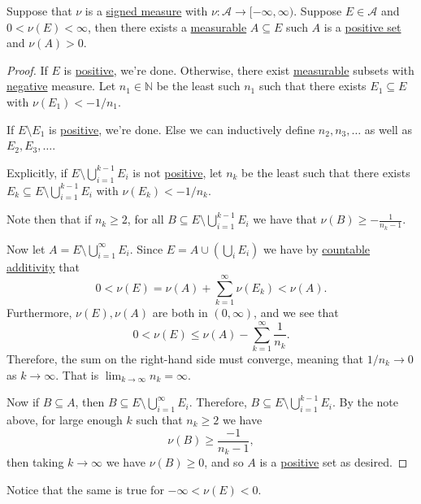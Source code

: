 \begin{lemma}\label{lma:lec28-2}
	Suppose that \(\nu\) is a \hyperref[def:signed-measure]{signed measure} with \(\nu \colon \mathcal{A} \to [-\infty, \infty)\).
	Suppose \(E \in \mathcal{A}\) and \(0 < \nu(E) < \infty\), then there exists a \hyperref[def:measurable-set]{measurable} \(A \subseteq E\)
	such \(A\) is a \hyperref[def:positive-set-for-a-signed-measure]{positive set} and \(\nu(A) > 0\).
\end{lemma}
\begin{proof}
	If \(E\) is \hyperref[def:positive-set-for-a-signed-measure]{positive}, we're done. Otherwise, there exist \hyperref[def:measurable-set]{measurable} subsets with
	\hyperref[def:negative-set-for-a-signed-measure]{negative} measure. Let \(n_1 \in \mathbb{N}\) be the least such \(n_1\) such that there exists
	\(E_1 \subseteq E\) with \(\nu(E_1) < -1/n_1\).

	If \(E \setminus E_1\) is \hyperref[def:positive-set-for-a-signed-measure]{positive}, we're done. Else we can inductively define \(n_2,n_3,\dots\) as well as \(E_2,E_3,\dots\).

	Explicitly, if \(E \setminus \bigcup_{i=1}^{k-1} E_i\) is not \hyperref[def:positive-set-for-a-signed-measure]{positive}, let \(n_k\) be the least such that there
	exists \(E_k \subseteq E \setminus \bigcup_{i=1}^{k-1} E_i\) with \(\nu(E_k) < -1/n_k\).

	Note then that if \(n_k \geq 2\), for all \(B \subseteq E \setminus \bigcup_{i=1}^{k-1}E_i\) we have that \(\nu(B) \geq -\frac{1}{n_k - 1}\).

	Now let \(A = E \setminus \bigcup_{i=1}^\infty E_i\). Since \(E = A \cup \left(\bigcup_i E_i\right)\) we have by \hyperref[def:measure-countable-additivity]{countable additivity} that
	\[
		0 < \nu(E) = \nu(A) + \sum_{k=1}^\infty \nu(E_k) < \nu(A).
	\]
	Furthermore, \(\nu(E),\nu(A)\) are both in \((0,\infty)\), and we see that
	\[
		0 < \nu(E) \leq \nu(A) - \sum_{k=1}^\infty \frac{1}{n_k}.
	\]
	Therefore, the sum on the right-hand side must converge, meaning that \(1/n_k \to 0\) as \(k \to \infty\). That is \(\lim_{k \to \infty} n_k = \infty\).

	Now if \(B \subseteq A\), then \(B \subseteq E \setminus \bigcup_{i=1}^\infty E_i\). Therefore, \(B \subseteq  E \setminus \bigcup_{i=1}^{k-1} E_i\). By the note above,
	for large enough \(k\) such that \(n_k \geq 2\) we have
	\[
		\nu(B) \geq \frac{-1}{n_k - 1},
	\]
	then taking \(k \to \infty\) we have \(\nu(B) \geq 0\), and so \(A\) is a \hyperref[def:positive-set-for-a-signed-measure]{positive} set as desired.
\end{proof}
\begin{remark}
	Notice that the same is true for \(-\infty < \nu (E) < 0\).
\end{remark}

